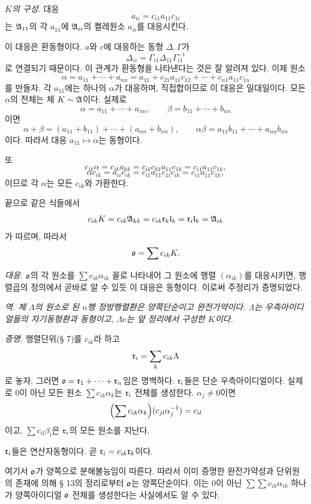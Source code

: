 \emph{\(K\)의 구성.} 대응
\[
        a_{ii}=c_{i1}a_{11}c_{1i}
\]
는 \(\mathfrak A_{11}\)의 각 \(a_{11}\)에 \(\mathfrak A_{ii}\)의 \glqq{}켤레원소\grqq{} \(a_{ii}\)를 대응시킨다.

이 대응은 환동형이다. \(a\)와 \(c\)에 대응하는 동형 \(\Delta,\Gamma\)가
\[
        \Delta_{ii}=\Gamma_{i1}\Delta_{11}\Gamma_{i1}^{-1}
\]
로 연결되기 때문이다. 이 관계가 환동형을 나타낸다는 것은 잘 알려져 있다. 이제 원소
\[
        \alpha=a_{11}+\cdots+a_{nn}
        =a_{11}+c_{21}a_{11}c_{12}+\cdots+c_{n1}a_{11}c_{1n}
\]
를 만들자. 각 \(a_{11}\)에는 하나의 \(\alpha\)가 대응하며, 직접합이므로 이 대응은 일대일이다. 모든 \(\alpha\)의 전체는 체 \(K\sim\mathfrak A\)이다. 실제로
\[
        \alpha=a_{11}+\cdots+a_{nn},
        \qquad
        \beta=b_{11}+\cdots+b_{nn}
\]
이면
\[
        \alpha+\beta=(a_{11}+b_{11})+\cdots+(a_{nn}+b_{nn}),
        \qquad
        \alpha\beta=a_{11}b_{11}+\cdots+a_{nn}b_{nn}
\]
이다. 따라서 대응 \(a_{11}\mapsto\alpha\)는 동형이다.

또
\[
        c_{ik}\alpha=c_{ik}a_{kk}
        =c_{ik}c_{k1}a_{11}c_{1k}=c_{i1}a_{11}c_{1k},
\]
\[
        \alpha c_{ik}=a_{ii}c_{ik}
        =c_{i1}a_{11}c_{1i}c_{ik}=c_{i1}a_{11}c_{1k},
\]
이므로 각 \(\alpha\)는 모든 \(c_{ik}\)와 가환한다.

끝으로 같은 식들에서
\[
        c_{ik}K=c_{ik}\mathfrak A_{kk}
        =c_{ik}\mathfrak r_k\mathfrak l_k=\mathfrak r_i\mathfrak l_k=\mathfrak A_{ik}
\]
가 따르며, 따라서
\[
        \mathfrak o=\sum c_{ik}K.
\]

\emph{대응.} \(\mathfrak o\)의 각 원소를 \(\sum c_{ik}\alpha_{ik}\) 꼴로 나타내어 그 원소에 행렬 \((\alpha_{ik})\)를 대응시키면, 행렬곱의 정의에서 곧바로 알 수 있듯 이 대응은 동형이다. 이로써 주정리가 증명되었다.

\emph{역. 체 \(\Lambda\)의 원소로 된 \(n\)행 정방행렬환은 양쪽단순이고 완전가약이다. \(\Lambda\)는 우측아이디얼들의 자기동형환과 동형이고, \(\Lambda e\)는 앞 정리에서 구성한 \(K\)이다.}

\emph{증명.} 행렬단위(§ 7)를 \(c_{ik}\)라 하고
\[
        \mathfrak r_i=\sum_k c_{ik}\Lambda
\]
로 놓자. 그러면 \(\mathfrak o=\mathfrak r_1+\cdots+\mathfrak r_n\)임은 명백하다. \(\mathfrak r_i\)들은 단순 우측아이디얼이다. 실제로 0이 아닌 모든 원소 \(\sum c_{ik}\alpha_k\)는 \(\mathfrak r_i\) 전체를 생성한다. \(\alpha_j\ne0\)이면
\[
        \Bigl(\sum c_{ik}\alpha_k\Bigr)
        (c_{jl}\alpha_j^{-1})=c_{il}
\]
이고, \(\sum c_{il}\beta_l\)은 \(\mathfrak r_i\)의 모든 원소를 지난다.

\(\mathfrak r_i\)들은 연산자동형이다. 곧 \(\mathfrak r_i=c_{ik}\mathfrak r_k\)이다.

여기서 \(\mathfrak o\)가 양쪽으로 분해불능임이 따른다. 따라서 이미 증명한 완전가약성과 단위원의 존재에 의해 § 13의 정리로부터 \(\mathfrak o\)는 양쪽단순이다. 이는 0이 아닌 \(\sum\sum c_{ik}\alpha_{ik}\) 하나가 양쪽아이디얼 \(\mathfrak o\) 전체를 생성한다는 사실에서도 알 수 있다.

